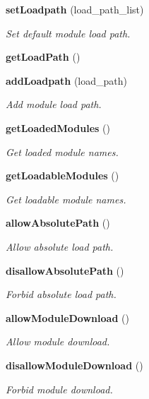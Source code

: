\begin{CompactItemize}
{\bf set\-Loadpath} (load\_\-path\_\-list)
\begin{CompactList}\small\item\em Set default module load path. \item\end{CompactList}\item 
{\bf get\-Load\-Path} ()
\item 
{\bf add\-Loadpath} (load\_\-path)
\begin{CompactList}\small\item\em Add module load path. \item\end{CompactList}\item 
{\bf get\-Loaded\-Modules} ()
\begin{CompactList}\small\item\em Get loaded module names. \item\end{CompactList}\item 
{\bf get\-Loadable\-Modules} ()
\begin{CompactList}\small\item\em Get loadable module names. \item\end{CompactList}\item 
{\bf allow\-Absolute\-Path} ()
\begin{CompactList}\small\item\em Allow absolute load path. \item\end{CompactList}\item 
{\bf disallow\-Absolute\-Path} ()
\begin{CompactList}\small\item\em Forbid absolute load path. \item\end{CompactList}\item 
{\bf allow\-Module\-Download} ()
\begin{CompactList}\small\item\em Allow module download. \item\end{CompactList}\item 
{\bf disallow\-Module\-Download} ()
\begin{CompactList}\small\item\em Forbid module download. \item\end{CompactList}\item 

\end{CompactItemize}
